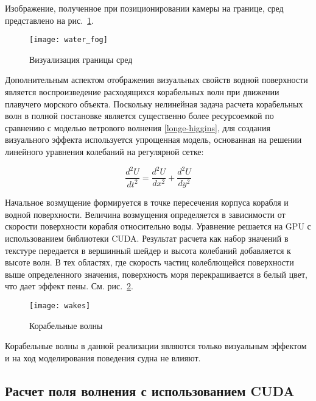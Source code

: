 Изображение, полученное при позиционировании камеры на границе, сред представлено на рис.~\ref{water_fog}.

\begin{figure}[ht]
\begin{center}
\texttt{[image: water\_fog]}
\end{center}
\caption{Визуализация границы сред}
\label{water_fog}
\end{figure}



Дополнительным аспектом отображения визуальных свойств водной поверхности является воспроизведение расходящихся корабельных волн при движении плавучего морского объекта. Поскольку нелинейная задача расчета корабельных волн в полной постановке является существенно более ресурсоемкой по сравнению с моделью ветрового волнения \eqref{longe-higgins}, для создания визуального эффекта используется упрощенная модель, основанная на решении линейного уравнения колебаний на регулярной сетке:

\begin{equation}
	\label{wake_equation}
	\frac{d^2U}{dt^2} = \frac{d^2U}{dx^2} +  \frac{d^2U}{dy^2}
\end{equation}

Начальное возмущение формируется в точке пересечения корпуса корабля и водной поверхности. Величина возмущения определяется в зависимости от скорости поверхности корабля относительно воды. Уравнение решается на GPU с использованием библиотеки CUDA. Результат расчета как набор значений в текстуре передается в вершинный шейдер и высота колебаний добавляется к высоте волн. В тех областях, где скорость частиц колеблющейся поверхности выше определенного значения, поверхность моря перекрашивается в белый цвет, что дает эффект пены. См. рис.~\ref{wakes}.

\begin{figure}[ht]
\begin{center}
\texttt{[image: wakes]}
\end{center}
\caption{Корабельные волны}
\label{wakes}
\end{figure}

Корабельные волны в данной реализации являются только визуальным эффектом и на ход моделирования поведения судна не влияют.



\subsection{Расчет поля волнения с использованием CUDA}

